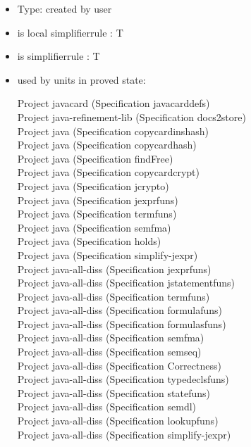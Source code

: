 \documentclass[a4paper]{article}
\begin{document}
\begin{itemize}

\item Type: created by user

\item is local simplifierrule : T
\item is simplifierrule : T
\item used by units in proved state:

Project javacard (Specification javacarddefs) \\
Project java-refinement-lib (Specification docs2store) \\
Project java (Specification copycardinshash) \\
Project java (Specification copycardhash) \\
Project java (Specification findFree) \\
Project java (Specification copycardcrypt) \\
Project java (Specification jcrypto) \\
Project java (Specification jexprfuns) \\
Project java (Specification termfuns) \\
Project java (Specification semfma) \\
Project java (Specification holds) \\
Project java (Specification simplify-jexpr) \\
Project java-all-diss (Specification jexprfuns) \\
Project java-all-diss (Specification jstatementfuns) \\
Project java-all-diss (Specification termfuns) \\
Project java-all-diss (Specification formulafuns) \\
Project java-all-diss (Specification formulasfuns) \\
Project java-all-diss (Specification semfma) \\
Project java-all-diss (Specification semseq) \\
Project java-all-diss (Specification Correctness) \\
Project java-all-diss (Specification typedeclsfuns) \\
Project java-all-diss (Specification statefuns) \\
Project java-all-diss (Specification semdl) \\
Project java-all-diss (Specification lookupfuns) \\
Project java-all-diss (Specification simplify-jexpr) \\

\end{itemize}
\end{document}
